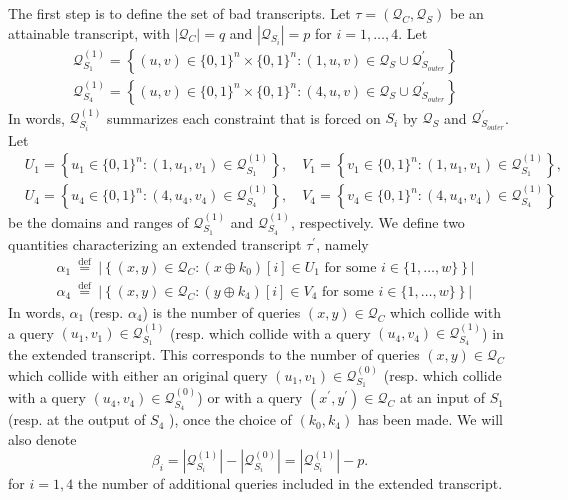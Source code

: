 The first step is to define the set of bad transcripts. Let $\tau = (\mathcal{Q}_C, \mathcal{Q}_{S})$ be an attainable transcript, with $|\mathcal{Q}_C| = q$ and $|\mathcal{Q}_{S_i}| = p$ for $i = 1, \ldots, 4$. Let
%
$$
\begin{aligned}
&\mathcal{Q}_{S_{1}}^{(1)}=\left\{(u, v) \in\{0,1\}^{n} \times\{0,1\}^{n}:(1, u, v) \in \mathcal{Q}_{S} \cup \mathcal{Q}_{S_{outer}}^{\prime}\right\}\\
&\mathcal{Q}_{S_{4}}^{(1)}=\left\{(u, v) \in\{0,1\}^{n} \times\{0,1\}^{n}:(4, u, v) \in \mathcal{Q}_{S} \cup \mathcal{Q}_{S_{outer}}^{\prime}\right\}
\end{aligned}
$$
%
In words, $\mathcal{Q}_{S_{i}}^{(1)}$ summarizes each constraint that is forced on $S_{i}$ by $\mathcal{Q}_{S}$ and $\mathcal{Q}_{S_{outer}}^{\prime}$. Let 
%
$$
\begin{aligned}
&U_{1}=\left\{u_{1} \in\{0,1\}^{n}:\left(1, u_{1}, v_{1}\right) \in \mathcal{Q}_{S_{1}}^{(1)}\right\}, \quad V_{1}=\left\{v_{1} \in\{0,1\}^{n}:\left(1, u_{1}, v_{1}\right) \in \mathcal{Q}_{S_{1}}^{(1)}\right\},\\
&U_{4}=\left\{u_{4} \in\{0,1\}^{n}:\left(4, u_{4}, v_{4}\right) \in \mathcal{Q}_{S_{4}}^{(1)}\right\}, \quad V_{4}=\left\{v_{4} \in\{0,1\}^{n}:\left(4, u_{4}, v_{4}\right) \in \mathcal{Q}_{S_{4}}^{(1)}\right\}
\end{aligned}
$$
%
be the domains and ranges of $\mathcal{Q}_{S_{1}}^{(1)}$ and $\mathcal{Q}_{S_{4}}^{(1)}$, respectively. We define two quantities characterizing an extended transcript $\tau^{\prime}$, namely
%
$$
\begin{aligned}
&\alpha_{1} \stackrel{\text { def }}{=} |\left\{(x, y) \in \mathcal{Q}_{C}: \left(x \oplus k_{0}\right)[i] \in U_{1} \text { for some } i \in\{1, \ldots, w\}\right\} |\\
&\alpha_{4} \stackrel{\text { def }}{=} |\left\{(x, y) \in \mathcal{Q}_{C}: \left(y \oplus k_{4}\right)[i] \in V_{4} \text { for some } i \in\{1, \ldots, w\}\right\} |
\end{aligned}
$$
%
In words, $\alpha_1$ (resp. $\alpha_4$) is the number of queries $(x, y) \in \mathcal{Q}_{C}$ which collide with a query $\left(u_{1}, v_{1}\right) \in \mathcal{Q}_{S_{1}}^{(1)}$ (resp. which collide with a query $\left(u_{4}, v_{4}\right) \in \mathcal{Q}_{S_{4}}^{(1)}$) in the extended transcript. This corresponds to the number of queries $(x, y) \in \mathcal{Q}_{C}$ which collide with either an original query $\left(u_{1}, v_{1}\right) \in \mathcal{Q}_{S_{1}}^{(0)}$ (resp. which collide with a query $\left(u_{4}, v_{4}\right) \in \mathcal{Q}_{S_{4}}^{(0)}$) or with a query $\left(x^{\prime}, y^{\prime}\right) \in \mathcal{Q}_{C}$ at an input of $S_1$ (resp. at the output of $S_4$ ), once the choice of $\left(k_{0}, k_{4}\right)$  has been made. We will also denote
%
$$
\beta_{i}=\left|\mathcal{Q}_{S_{i}}^{(1)}\right|-\left|\mathcal{Q}_{S_{i}}^{(0)}\right|=\left|\mathcal{Q}_{S_{i}}^{(1)}\right|-p.
$$
%
for $i=1, 4$ the number of additional queries included in the extended transcript.



